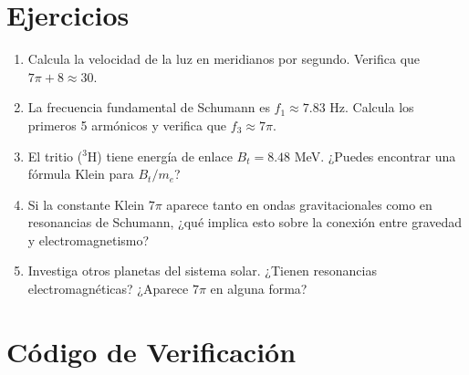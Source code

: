 \section*{Ejercicios}

\begin{enumerate}
    \item Calcula la velocidad de la luz en meridianos por segundo.
    Verifica que $7\pi + 8 \approx 30$.

    \item La frecuencia fundamental de Schumann es $f_1 \approx 7.83$ Hz.
    Calcula los primeros 5 armónicos y verifica que $f_3 \approx 7\pi$.

    \item El tritio ($^3$H) tiene energía de enlace $B_t = 8.48$ MeV.
    ¿Puedes encontrar una fórmula Klein para $B_t/m_e$?

    \item Si la constante Klein $7\pi$ aparece tanto en ondas gravitacionales
    como en resonancias de Schumann, ¿qué implica esto sobre la conexión
    entre gravedad y electromagnetismo?

    \item Investiga otros planetas del sistema solar.
    ¿Tienen resonancias electromagnéticas? ¿Aparece $7\pi$ en alguna forma?
\end{enumerate}


\section*{Código de Verificación}


